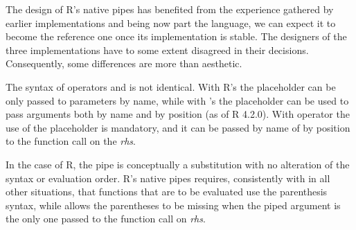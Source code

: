 \documentclass[krantz2]{krantz}\usepackage{knitr}
\begin{document}
\begin{explainbox}
The design of R's native pipes has benefited from the experience gathered by earlier implementations and being now part the language, we can expect it to become the reference one once its implementation is stable. The designers of the three implementations have to some extent disagreed in their decisions. Consequently, some differences are more than aesthetic.

The syntax of operators \Roperator{|>} and \Roperator{\%>\%} is not identical. With R's \Roperator{|>} the placeholder \code{\_} can be only passed to parameters by name, while with 's \Roperator{\%>\%} the placeholder  can be used to pass arguments both by name and by position (as of R 4.2.0). With operator  the use of the placeholder  is mandatory, and it can be passed by name of by position to the function call on the \textit{rhs}.

In the case of R, the pipe is conceptually a substitution with no alteration of the syntax or evaluation order. R's native pipes requires, consistently with \Rlang in all other situations, that functions that are to be evaluated use the parenthesis syntax, while  allows the parentheses to be missing when the piped argument is the only one passed to the function call on \textit{rhs}.

\begin{knitrout}\footnotesize
{}\color{fgcolor}
\end{knitrout}
\end{explainbox}
\end{document}
